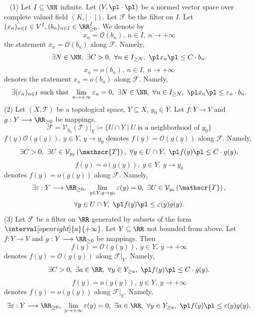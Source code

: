 \begin{exampleenv}
    \ \newline
    (1) Let $I\subseteq\NN$ infinite. Let $(V,\pl\cdot\pl)$ be a normed vector space over complete valued field $(K,\left|\ \cdot\ \right|)$. Let $\mathcal{F}$ be the filter on $I$. Let $(x_n)_{n\in I}\in V^I, (b_n)_{n\in I}\in \RR_{\ge 0}^I$. We denote by 
        $$x_n=\mathcal{O}\left(b_n\right),\ n\in I,\ n\rightarrow+\infty$$
        the statement $x_n=\mathcal{O}\left(b_n\right)$ along $\mathcal{F}$. Namely,
        $$\exists N\in \NN,\ \exists C>0,\ \forall n\in I_{\ge N},\ \pl x_n\pl \le C\cdot b_n.$$
        $$x_n=o\left(b_n\right),\ n\in I,\ n\rightarrow +\infty$$
        denotes the statement $x_n=o\left(b_n\right)$ along $\mathcal{F}$. Namely, 
        $$\exists (\varepsilon_n)_{n\in I}\text{ such that } \lim_{n\rightarrow +\infty}\varepsilon_n=0,\ \exists N\in \NN,\ \forall n\in I_{\ge N},\ \pl x_n\pl \le \varepsilon_{n}\cdot b_n.$$
    \newline
    (2) Let $(X,\mathscr{T})$ be a topological space, $Y\subseteq X$, $y_0\in \overline{Y}$. Let $f:Y\longrightarrow V$ and $g:Y\longrightarrow \RR_{\ge 0}$ be mappings. 
    $$\mathcal{F}=\mathcal{V}_{y_0}\left(\mathscr{T}\right)|_Y\coloneq\{U\cap Y\mid U \text{ is a neighborhood of } y_0 \}$$
    $f(y)\mathcal{O}\left(g(y)\right)$, $y\in Y$, $y\rightarrow y_0$ denotes $f(y)=\mathcal{O}\left(g(y)\right)$ along $\mathcal{F}$. Namely, 
    $$\exists C>0,\ \exists U\in \mathcal{V}_{y_0}\left(\mathscr{T}\right),\ \forall y\in U\cap Y,\ \pl f(y)\pl \le C\cdot g(y).$$
    $$f(y)=o\left(g(y)\right),\ y\in Y,\ y\rightarrow y_0$$
    denotes $f(y)=o\left(g(y)\right)$ along $\mathcal{F}$. Namely, 
    $$\exists \varepsilon:Y\longrightarrow \RR_{\ge 0},\ \lim_{y\in Y,y\rightarrow y_0}\varepsilon(y)=0,\ \exists U\in \mathcal{V}_{y_0}\left(\mathscr{T}\right),$$
    $$ \forall y\in U\cap Y,\ \pl f(y)\pl \le \varepsilon(y)g(y).$$
    (3) Let $\mathcal{F}$ be a filter on $\RR$ generated by subsets of the form $\interval[open right]{a}{+\infty}$. Let $Y\subseteq \RR$ not bounded from above. Let $f:Y\longrightarrow V$ and $g:Y\longrightarrow \RR_{\ge 0}$ be mappings. Then
    $$f(y)=\mathcal{O}\left(g(y)\right),\ y\in Y,\ y\rightarrow +\infty$$
    denotes $f(y)=\mathcal{O}\left(g(y)\right)$ along $\mathcal{F}|_Y$. Namely, 
    $$\exists C>0,\ \exists a\in \RR,\ \forall y\in Y_{\ge a},\ \pl f(y)\pl \le C\cdot g(y).$$
    $$f(y)=o\left(g(y)\right),\ y\in Y,\ y\rightarrow +\infty$$
    denotes $f(y)=o\left(g(y)\right)$ along $\mathcal{F}|_Y$. Namely, 
    $$\exists \varepsilon:Y\longrightarrow \RR_{\ge 0},\ \lim_{y\rightarrow +\infty}\varepsilon(y)=0,\ \exists a\in \RR,\ \forall y\in Y_{\ge a},\ \pl f(y)\pl \le \varepsilon(y)g(y).$$
\end{exampleenv}
